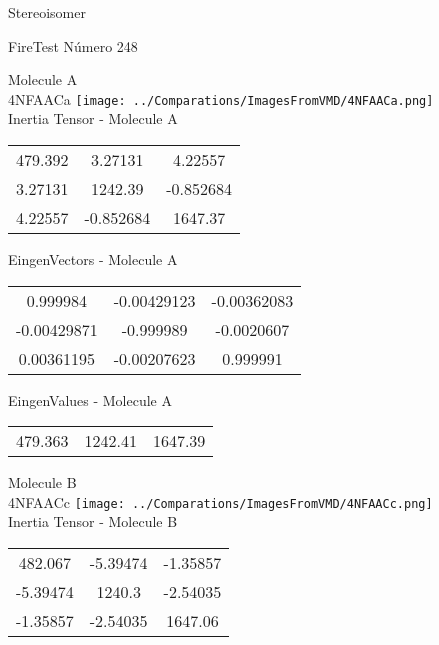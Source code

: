 \begin{center}
\vtab
\vtab
\textcolor{NavyBlue}{\Large Stereoisomer}
\end{center}

 \newpage

\vtab[-2cm]
\begin{center}
{\large FireTest \tab Número 248}
\end{center}
\begin{multicols}{2}
\begin{center}

Molecule A \\ 
4NFAACa
\texttt{[image: ../Comparations/ImagesFromVMD/4NFAACa.png]}
\\
Inertia Tensor - Molecule A \\
\vtab

\begin{tabular}{|c c c|}
479.392	 & 	3.27131	 & 	4.22557	 \\
3.27131	 & 	1242.39	 & 	-0.852684	 \\
4.22557	 & 	-0.852684	 & 	1647.37
\end{tabular}

\vtab
 EingenVectors - Molecule A     \\
\vtab
\begin{tabular}{|c c c|}
0.999984	 & 	-0.00429123	 & 	-0.00362083	 \\
-0.00429871	 & 	-0.999989	 & 	-0.0020607	 \\
0.00361195	 & 	-0.00207623	 & 	0.999991
\end{tabular}

\vtab
 EingenValues - Molecule A     \\
\vtab
\begin{tabular}{|c c c|}
479.363	 & 	1242.41	 & 	1647.39	 \\
\end{tabular}
\columnbreak

Molecule B \\ 
4NFAACc
\texttt{[image: ../Comparations/ImagesFromVMD/4NFAACc.png]}
\\
Inertia Tensor - Molecule B \\
\vtab

\begin{tabular}{|c c c|}
482.067	 & 	-5.39474	 & 	-1.35857	 \\
-5.39474	 & 	1240.3	 & 	-2.54035	 \\
-1.35857	 & 	-2.54035	 & 	1647.06
\end{tabular}


\end{center}
\end{multicols}
